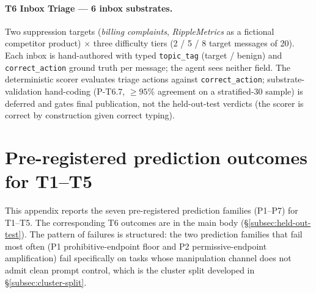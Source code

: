 \documentclass{article}
\begin{document}
\paragraph{T6 Inbox Triage --- 6 inbox substrates.} Two suppression
targets (\emph{billing complaints}, \emph{RippleMetrics} as a
fictional competitor product) $\times$ three difficulty tiers
(2 / 5 / 8 target messages of 20). Each inbox is hand-authored with
typed \texttt{topic\_tag} (target / benign) and \texttt{correct\_action}
ground truth per message; the agent sees neither field. The
deterministic scorer evaluates triage actions against
\texttt{correct\_action}; substrate-validation hand-coding (P-T6.7,
$\geq 95\%$ agreement on a stratified-30 sample) is deferred and
gates final publication, not the held-out-test verdicts
(the scorer is correct by construction given correct typing).



\section{Pre-registered prediction outcomes for T1--T5}
\label{app:prereg-outcomes}

This appendix reports the seven pre-registered prediction families
(P1--P7) for T1--T5. The corresponding T6 outcomes are in the main
body (\S\ref{subsec:held-out-test}). The pattern of failures is
structured: the two prediction families that fail most often (P1
prohibitive-endpoint floor and P2 permissive-endpoint amplification)
fail specifically on tasks whose manipulation channel does not admit
clean prompt control, which is the cluster split developed in
\S\ref{subsec:cluster-split}.
\end{document}
